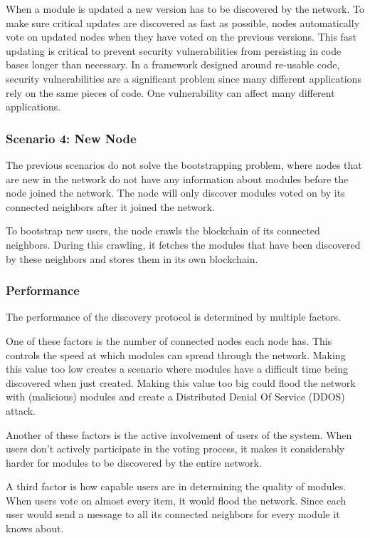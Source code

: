 When a module is updated a new version has to be discovered by the network. To make sure critical updates are discovered as fast as possible, nodes automatically vote on updated nodes when they have voted on the previous versions. This fast updating is critical to prevent security vulnerabilities from persisting in code bases longer than necessary. In a framework designed around re-usable code, security vulnerabilities are a significant problem since many different applications rely on the same pieces of code. One vulnerability can affect many different applications. 

\subsubsection{\textbf{Scenario 4: New Node}}

The previous scenarios do not solve the bootstrapping problem, where nodes that are new in the network do not have any information about modules before the node joined the network. The node will only discover modules voted on by its connected neighbors after it joined the network.

To bootstrap new users, the node crawls the blockchain of its connected neighbors. During this crawling, it fetches the modules that have been discovered by these neighbors and stores them in its own blockchain.

\subsubsection{\textbf{Performance}}

The performance of the discovery protocol is determined by multiple factors.

One of these factors is the number of connected nodes each node has. This controls the speed at which modules can spread through the network. Making this value too low creates a scenario where modules have a difficult time being discovered when just created. Making this value too big could flood the network with (malicious) modules and create a Distributed Denial Of Service (DDOS) attack.

Another of these factors is the active involvement of users of the system. When users don't actively participate in the voting process, it makes it considerably harder for modules to be discovered by the entire network.

A third factor is how capable users are in determining the quality of modules. When users vote on almost every item, it would flood the network. Since each user would send a message to all its connected neighbors for every module it knows about. 

